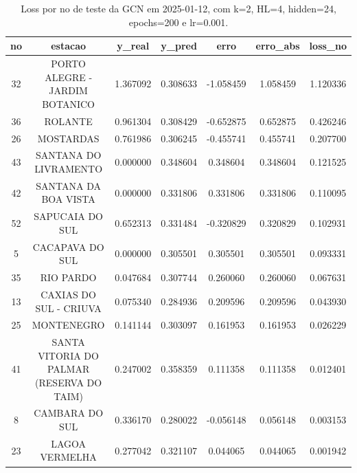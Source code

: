 \begin{table}[h]
\centering
\caption{Loss por no de teste da GCN em 2025-01-12, com k=2, HL=4, hidden=24, epochs=200 e lr=0.001.}
\label{tab:gcn_loss_k2_hl4_h24_e200_d20250112}
\begin{tabular}{ccccccc}
\toprule
no & estacao & y\_real & y\_pred & erro & erro\_abs & loss\_no \\
\midrule
32 & PORTO ALEGRE - JARDIM BOTANICO & 1.367092 & 0.308633 & -1.058459 & 1.058459 & 1.120336 \\
36 & ROLANTE & 0.961304 & 0.308429 & -0.652875 & 0.652875 & 0.426246 \\
26 & MOSTARDAS & 0.761986 & 0.306245 & -0.455741 & 0.455741 & 0.207700 \\
43 & SANTANA DO LIVRAMENTO & 0.000000 & 0.348604 & 0.348604 & 0.348604 & 0.121525 \\
42 & SANTANA DA BOA VISTA & 0.000000 & 0.331806 & 0.331806 & 0.331806 & 0.110095 \\
52 & SAPUCAIA DO SUL & 0.652313 & 0.331484 & -0.320829 & 0.320829 & 0.102931 \\
5 & CACAPAVA DO SUL & 0.000000 & 0.305501 & 0.305501 & 0.305501 & 0.093331 \\
35 & RIO PARDO & 0.047684 & 0.307744 & 0.260060 & 0.260060 & 0.067631 \\
13 & CAXIAS DO SUL - CRIUVA & 0.075340 & 0.284936 & 0.209596 & 0.209596 & 0.043930 \\
25 & MONTENEGRO & 0.141144 & 0.303097 & 0.161953 & 0.161953 & 0.026229 \\
41 & SANTA VITORIA DO PALMAR (RESERVA DO TAIM) & 0.247002 & 0.358359 & 0.111358 & 0.111358 & 0.012401 \\
8 & CAMBARA DO SUL & 0.336170 & 0.280022 & -0.056148 & 0.056148 & 0.003153 \\
23 & LAGOA VERMELHA & 0.277042 & 0.321107 & 0.044065 & 0.044065 & 0.001942 \\
\bottomrule
\end{tabular}
\end{table}
